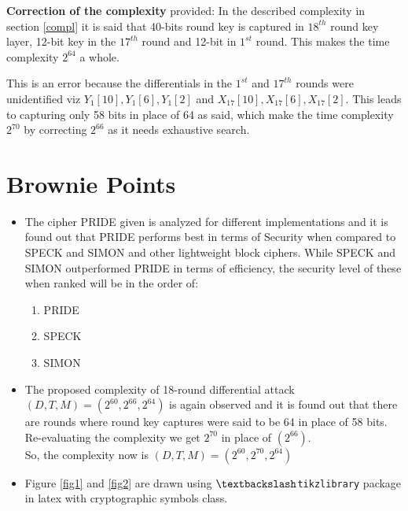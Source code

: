 \documentclass{transcrypto}
\begin{document}
	\textbf{Correction of the complexity} provided:
	In the described complexity in\\ section \ref{compl} it is said that 40-bits round key is captured in $ 18^{th} $ round key layer, 12-bit key in the $ 17^{th} $ round and 12-bit in $ 1^{st} $ round. This makes the time complexity $2^{64}$ a whole.
	
	This is an error because the differentials in the $ 1^{st} $ and $ 17^{th} $ rounds were unidentified viz $Y_1[10], Y_1[6], Y_1[2]$ and $X_{17}[10], X_{17}[6], X_{17}[2]$. This leads to capturing only 58 bits in place of 64 as said, which make the time complexity $2^{70}$ by correcting $2^{66}$ as it needs exhaustive search.
	
	\section*{Brownie Points}
	\begin{itemize}
		\item The cipher PRIDE given is analyzed for different implementations and it is found out that PRIDE performs best in terms of Security when compared to SPECK and SIMON and other lightweight block ciphers. While SPECK and SIMON outperformed PRIDE in terms of efficiency, the security level of these when ranked will be in the order of:
		\begin{enumerate}
			\item PRIDE
			\item SPECK
			\item SIMON
		\end{enumerate}
		
		\item The proposed complexity of 18-round differential attack $ (D,T,M) = (2^{60},2^{66},2^{64}) $ is again observed and it is found out that there are rounds where round key captures were said to be 64 in place of 58 bits. Re-evaluating the complexity we get $2^{70}$ in place of $(2^{66})$.\\
		So, the complexity now is $ (D,T,M) = (2^{60},2^{70},2^{64}) $
		
		\item Figure \ref{fig1} and \ref{fig2} are drawn using \texttt{$\textbackslash$tikzlibrary} package in latex with cryptographic symbols class.
	\end{itemize}
	
	\newpage
	
	
	
\end{document}
